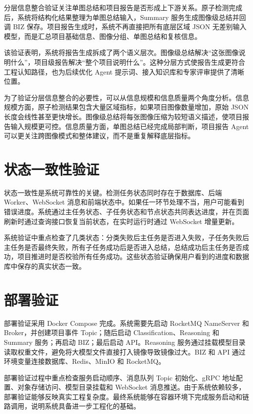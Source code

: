 分层信息整合验证关注单图总结和项目报告是否形成上下游关系。原子检测完成后，系统将结构化结果整理为单图总结输入，Summary 服务生成图像级总结并回调 BIZ 保存。项目报告生成时，系统不再直接把所有底层区域 JSON 无差别输入模型，而是汇总项目基础信息、图像分组、单图总结和复核信息。

该验证表明，系统将报告生成拆成了两个语义层次。图像级总结解决“这张图像说明什么”，项目级报告解决“整个项目说明什么”。这种分层方式使报告生成更符合工程认知路径，也为后续优化 Agent 提示词、接入知识库和专家评审提供了清晰位置。

为了验证分层信息整合的必要性，可以从信息规模和信息质量两个角度分析。信息规模方面，原子检测结果包含大量区域指标，如果项目图像数量增加，原始 JSON 长度会线性甚至更快增长。图像级总结将每张图像压缩为较短语义描述，使项目报告输入规模更可控。信息质量方面，单图总结已经完成局部判断，项目报告 Agent 可以更关注跨图像模式和整体建议，而不是重复解释底层指标。

\section{状态一致性验证}
\label{sec:state-consistency-validation}

状态一致性是系统可靠性的关键。检测任务状态同时存在于数据库、后端 Worker、WebSocket 消息和前端状态中。如果任一环节处理不当，用户可能看到错误进度。系统通过主任务状态、子任务状态和节点状态共同表达进度，并在页面刷新时通过查询接口恢复当前状态，在实时运行时通过 WebSocket 增量更新。

系统验证中重点检查了几类状态：分类失败后主任务是否进入失败，子任务失败后主任务是否最终失败，所有子任务成功后是否进入总结，总结成功后主任务是否成功，项目推进时是否校验所有任务成功。这些状态验证确保用户看到的进度和数据库中保存的真实状态一致。

\section{部署验证}
\label{sec:deployment-validation}

部署验证采用 Docker Compose 完成。系统需要先启动 RocketMQ NameServer 和 Broker，并创建项目事件 Topic；随后启动 Classification、Reasoning 和 Summary 服务；再启动 BIZ；最后启动 API。Reasoning 服务通过挂载模型目录读取权重文件，避免将大模型文件直接打入镜像导致镜像过大。BIZ 和 API 通过环境变量连接数据库、Redis、MinIO 和 RocketMQ。

部署验证过程中重点检查服务启动顺序、消息队列 Topic 初始化、gRPC 地址配置、对象存储访问、模型目录挂载和 WebSocket 消息推送。由于系统依赖较多，部署验证能够反映真实工程复杂度。最终系统能够在容器环境下完成服务启动和链路调用，说明系统具备进一步工程化的基础。

